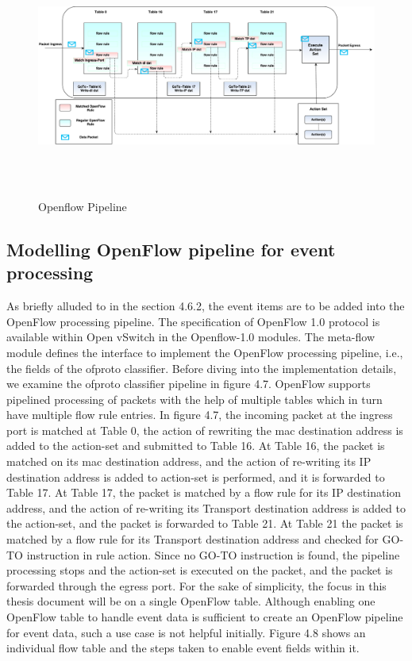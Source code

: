 \begin{figure}[H]
 \centering
 \caption{Openflow Pipeline}
 \includegraphics[height=8cm,width=19cm]{pipeline05.pdf}
\end{figure}

\subsection{Modelling OpenFlow pipeline for event processing}
As briefly alluded to in the section 4.6.2, the event items are to be added into the OpenFlow processing pipeline. The specification of OpenFlow 1.0 protocol is available within Open vSwitch in the Openflow-1.0 modules. The meta-flow module defines the interface to implement the OpenFlow processing pipeline, i.e., the fields of the ofproto classifier. Before diving into the implementation details, we examine the ofproto classifier pipeline in figure 4.7. OpenFlow supports pipelined processing of packets with the help of multiple tables which in turn have multiple flow rule entries. In figure 4.7, the incoming packet at the ingress port is matched at Table 0, the action of rewriting the mac destination address is added to the action-set and submitted to Table 16. At Table 16, the packet is matched on its mac destination address, and the action of re-writing its IP destination address is added to action-set is performed, and it is forwarded to Table 17. At Table 17, the packet is matched by a flow rule for its IP destination address, and the action of re-writing its Transport destination address is added to the action-set, and the packet is forwarded to Table 21. At Table 21 the packet is matched by a flow rule for its Transport destination address and checked for GO-TO instruction in rule action. Since no GO-TO instruction is found, the pipeline processing stops and the action-set is executed on the packet, and the packet is forwarded through the egress port. For the sake of simplicity, the focus in this thesis document will be on a single OpenFlow table. Although enabling one OpenFlow table to handle event data is sufficient to create an OpenFlow pipeline for event data, such a use case is not helpful initially. Figure 4.8 shows an individual flow table and the steps taken to enable event fields within it. 

